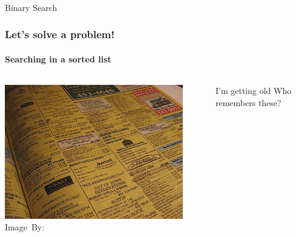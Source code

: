 
\begin{frame}[fragile]\frametitle{}
\begin{center}
{\Large Binary Search}
\end{center}

\end{frame}


\begin{frame}
	\frametitle{Let's solve a problem!}
	\framesubtitle{Searching in a sorted list}
	
	\begin{columns}
	\begin{center}
		\includegraphics[width=0.9\textwidth]{images/phonebook.jpg}\\
		\hspace*{15pt}\hbox{\scriptsize Image By:}
	\end{center}
		\begin{block}{I'm getting old}
			Who remembers these?
		\end{block}
			
	\end{columns}
\end{frame}

